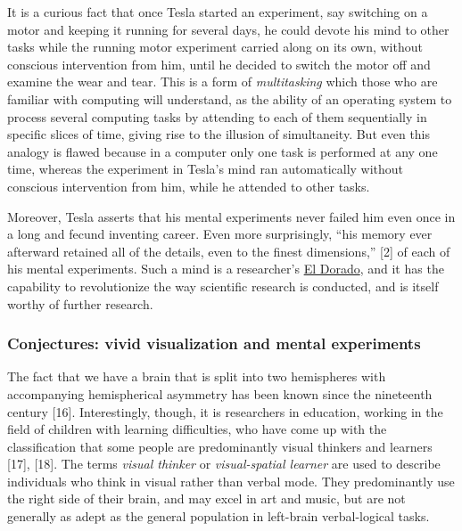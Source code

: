 \documentclass[
  12pt,
  british,
  a4paper,
]{article}
\begin{document}
It is a curious fact that once Tesla started an experiment, say
switching on a motor and keeping it running for several days, he could
devote his mind to other tasks while the running motor experiment
carried along on its own, without conscious intervention from him, until
he decided to switch the motor off and examine the wear and tear. This
is a form of \emph{multitasking} which those who are familiar with
computing will understand, as the ability of an operating system to
process several computing tasks by attending to each of them
sequentially in specific slices of time, giving rise to the illusion of
simultaneity. But even this analogy is flawed because in a computer only
one task is performed at any one time, whereas the experiment in Tesla's
mind ran automatically without conscious intervention from him, while he
attended to other tasks.

Moreover, Tesla asserts that his mental experiments never failed him
even once in a long and fecund inventing career. Even more surprisingly,
``his memory ever afterward retained all of the details, even to the
finest dimensions,'' {[}2{]} of each of his mental experiments. Such a
mind is a researcher's
\href{https://www.thefreedictionary.com/El+dorado}{El Dorado}, and it
has the capability to revolutionize the way scientific research is
conducted, and is itself worthy of further research.

\hypertarget{conjectures-vivid-visualization-and-mental-experiments}{%
\subsubsection{Conjectures: vivid visualization and mental
experiments}\label{conjectures-vivid-visualization-and-mental-experiments}}

The fact that we have a brain that is split into two hemispheres with
accompanying hemispherical asymmetry has been known since the nineteenth
century {[}16{]}. Interestingly, though, it is researchers in education,
working in the field of children with learning difficulties, who have
come up with the classification that some people are predominantly
visual thinkers and learners {[}17{]}, {[}18{]}. The terms \emph{visual
thinker} or \emph{visual-spatial learner} are used to describe
individuals who think in visual rather than verbal mode. They
predominantly use the right side of their brain, and may excel in art
and music, but are not generally as adept as the general population in
left-brain verbal-logical tasks.
\end{document}
